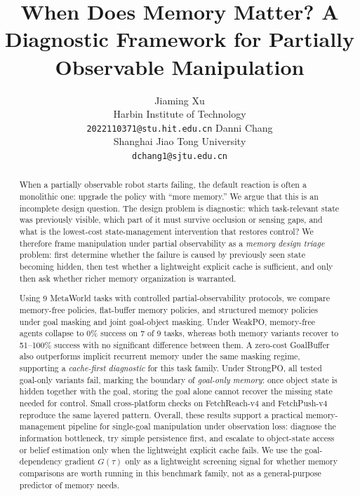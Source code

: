 \documentclass{article}
\title{When Does Memory Matter? A Diagnostic Framework for Partially Observable Manipulation}
\author{
Jiaming Xu\\
Harbin Institute of Technology\\
\texttt{2022110371@stu.hit.edu.cn}
\And
Danni Chang\\
Shanghai Jiao Tong University\\
\texttt{dchang1@sjtu.edu.cn}
}
\date{}
\begin{document}
\maketitle


\begin{abstract}
When a partially observable robot starts failing, the default reaction is often a monolithic one: upgrade the policy with ``more memory.'' We argue that this is an incomplete design question. The design problem is diagnostic: which task-relevant state was previously visible, which part of it must survive occlusion or sensing gaps, and what is the lowest-cost state-management intervention that restores control? We therefore frame manipulation under partial observability as a \emph{memory design triage} problem: first determine whether the failure is caused by previously seen state becoming hidden, then test whether a lightweight explicit cache is sufficient, and only then ask whether richer memory organization is warranted.

Using 9 MetaWorld tasks with controlled partial-observability protocols, we compare memory-free policies, flat-buffer memory policies, and structured memory policies under goal masking and joint goal-object masking. Under WeakPO, memory-free agents collapse to 0\% success on 7 of 9 tasks, whereas both memory variants recover to 51--100\% success with no significant difference between them. A zero-cost GoalBuffer also outperforms implicit recurrent memory under the same masking regime, supporting a \emph{cache-first diagnostic} for this task family. Under StrongPO, all tested goal-only variants fail, marking the boundary of \emph{goal-only memory}: once object state is hidden together with the goal, storing the goal alone cannot recover the missing state needed for control. Small cross-platform checks on FetchReach-v4 and FetchPush-v4 reproduce the same layered pattern. Overall, these results support a practical memory-management pipeline for single-goal manipulation under observation loss: diagnose the information bottleneck, try simple persistence first, and escalate to object-state access or belief estimation only when the lightweight explicit cache fails. We use the goal-dependency gradient $G(\tau)$ only as a lightweight screening signal for whether memory comparisons are worth running in this benchmark family, not as a general-purpose predictor of memory needs.
\end{abstract}
\end{document}
